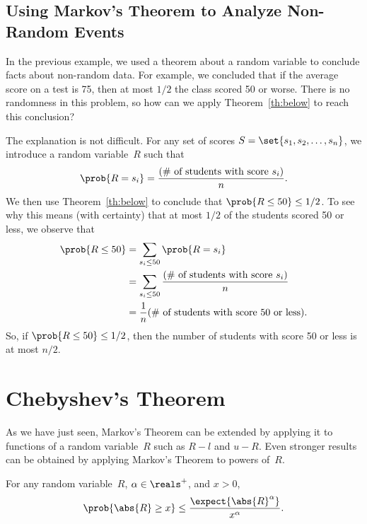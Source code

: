\subsection{Using Markov's Theorem to Analyze Non-Random Events}

In the previous example, we used a theorem about a random variable to
conclude facts about non-random data.  For example, we concluded that
if the average score on a test is 75, then at most $1/2$ the class
scored 50 or worse.  There is no randomness in this problem, so how
can we apply Theorem~\ref{th:below} to reach this conclusion?

The explanation is not difficult.  For any set of scores $S =
\set{s_1, s_2, \dots, s_n}$, we introduce a random variable~$R$ such
that
\[
\prob{R = s_i} = \frac{\text{(\# of students with score $s_i$)}}{n}.
\]
We then use Theorem~\ref{th:below} to conclude that $\prob{R \leq 50}
\leq 1/2$.  To see why this means (with certainty) that at most
$1/2$ of the students scored 50 or less, we observe that
\begin{align*}
\prob{R \leq 50}
    & = \sum_{s_i \leq 50} \prob{R = s_i} \\
    & = \sum_{s_i \leq 50} \frac{\text{(\# of students with score $s_i$)}}{n} \\
    & = \frac{1}{n} \text{(\# of students with score 50 or less)}.
\end{align*}
So, if $\prob{R \leq 50} \leq 1/2$, then the number of students
with score 50 or less is at most $n/2$.

\begin{problems}

\classproblems
{}

\end{problems}

\section{Chebyshev's Theorem}

As we have just seen, Markov's Theorem can be extended by applying it
to functions of a random variable~$R$ such as $R - l$ and $u - R$.
Even stronger results can be obtained by applying Markov's Theorem to
powers of~$R$.

\begin{lemma}\label{lem:Markov2}
For any random variable~$R$, $\alpha \in \reals^+$, and $x > 0$,
\[
\prob{\abs{R} \geq x} \leq \frac{\expect{\abs{R}^\alpha}}{x^\alpha}.
\]
\end{lemma}


